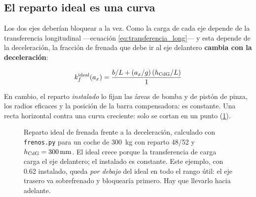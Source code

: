 \subsection{El reparto ideal es una curva}

Los dos ejes deberían bloquear a la vez. Como la carga de cada eje depende de la
transferencia longitudinal ---ecuación \eqref{eq:transferencia_long}--- y esta
depende de la deceleración, la fracción de frenada que debe ir al eje delantero
\textbf{cambia con la deceleración}:

\begin{equation}
  k_f^{\text{ideal}}(a_x) =
     \frac{b/L + (a_x/g)\,(h_{\mathrm{CdG}}/L)}{1}
  \label{eq:reparto_ideal}
\end{equation}

En cambio, el reparto \emph{instalado} lo fijan las áreas de bomba y de pistón
de pinza, los radios eficaces y la posición de la barra compensadora: es
constante. Una recta horizontal contra una curva creciente: solo se cortan en un
punto (\cref{fig:frenos:reparto}).

\begin{figure}[htbp]
\centering
{}
\caption[Reparto de frenada ideal e instalado]{Reparto ideal de frenada frente a
la deceleración, calculado con \texttt{frenos.py} para un coche de
\SI{300}{\kilogram} con reparto \num{48}/\num{52} y
$h_{\mathrm{CdG}} = \SI{300}{\milli\meter}$. El ideal crece porque la transferencia de carga
carga el eje delantero; el instalado es constante. Este ejemplo, con
\num{0.62} instalado, queda \emph{por debajo} del ideal en todo el rango útil:
el eje trasero va sobrefrenado y bloquearía primero. Hay que llevarlo hacia
adelante.}
\label{fig:frenos:reparto}
\end{figure}

